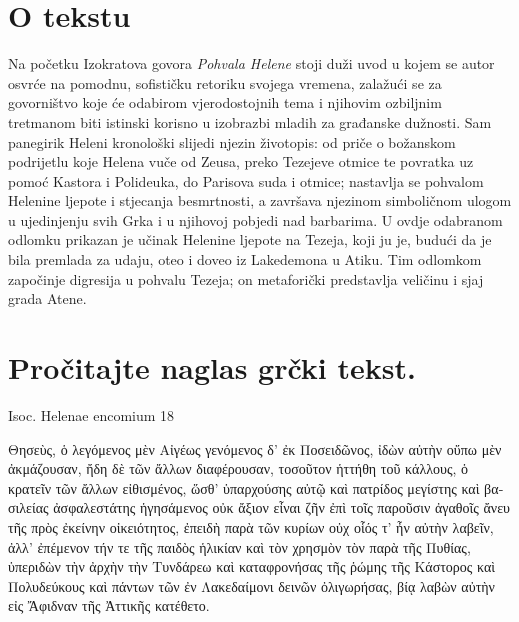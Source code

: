 


\section*{O tekstu}

Na početku Izokratova govora \textit{Pohvala Helene} stoji duži uvod u kojem se autor osvrće na pomodnu, sofističku retoriku svojega vremena, zalažući se za govorništvo koje će odabirom vjerodostojnih tema i njihovim ozbiljnim tretmanom biti istinski korisno u izobrazbi mladih za građanske dužnosti. Sam panegirik Heleni kronološki slijedi njezin životopis: od priče o božanskom podrijetlu koje Helena vuče od Zeusa, preko Tezejeve otmice te povratka uz pomoć Kastora i Polideuka, do Parisova suda i otmice; nastavlja se pohvalom Helenine ljepote i stjecanja besmrtnosti, a završava njezinom simboličnom ulogom u ujedinjenju svih Grka i u njihovoj pobjedi nad barbarima. U ovdje odabranom odlomku prikazan je učinak Helenine ljepote na Tezeja, koji ju je, budući da je bila premlada za udaju, oteo i doveo iz Lakedemona u Atiku. Tim odlomkom započinje digresija u pohvalu Tezeja; on metaforički predstavlja veličinu i sjaj grada Atene.


\section*{Pročitajte naglas grčki tekst.}
Isoc. Helenae encomium 18

\medskip

{\large
\begin{greek}
\noindent Θησεὺς, ὁ λεγόμενος μὲν Αἰγέως γενόμενος δ' ἐκ Ποσειδῶνος, ἰδὼν αὐτὴν οὔπω μὲν ἀκμάζουσαν, ἤδη δὲ τῶν ἄλλων διαφέρουσαν, τοσοῦτον ἡττήθη τοῦ κάλλους, ὁ κρατεῖν τῶν ἄλλων εἰθισμένος, ὥσθ' ὑπαρχούσης αὐτῷ καὶ πατρίδος μεγίστης καὶ βασιλείας ἀσφαλεστάτης ἡγησάμενος οὐκ ἄξιον εἶναι ζῆν ἐπὶ τοῖς παροῦσιν ἀγαθοῖς ἄνευ τῆς πρὸς ἐκείνην οἰκειότητος, ἐπειδὴ παρὰ τῶν κυρίων οὐχ οἷός τ' ἦν αὐτὴν λαβεῖν, ἀλλ' ἐπέμενον τήν τε τῆς παιδὸς ἡλικίαν καὶ τὸν χρησμὸν τὸν παρὰ τῆς Πυθίας, ὑπεριδὼν τὴν ἀρχὴν τὴν Τυνδάρεω καὶ καταφρονήσας τῆς ῥώμης τῆς Κάστορος καὶ Πολυδεύκους καὶ πάντων τῶν ἐν Λακεδαίμονι δεινῶν ὀλιγωρήσας, βίᾳ λαβὼν αὐτὴν εἰς Ἄφιδναν τῆς Ἀττικῆς κατέθετο.

\end{greek}

}

